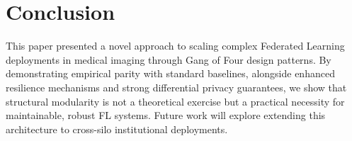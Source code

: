 \documentclass[10pt, conference]{IEEEtran}
\begin{document}
\section{Conclusion}
This paper presented a novel approach to scaling complex Federated Learning deployments in medical imaging through Gang of Four design patterns. By demonstrating empirical parity with standard baselines, alongside enhanced resilience mechanisms and strong differential privacy guarantees, we show that structural modularity is not a theoretical exercise but a practical necessity for maintainable, robust FL systems. Future work will explore extending this architecture to cross-silo institutional deployments.



\end{document}
